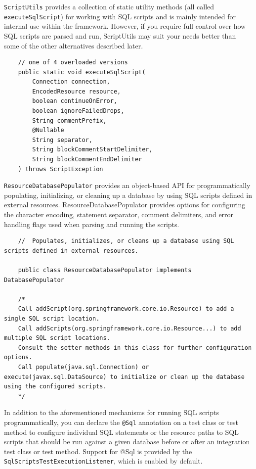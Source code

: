 \documentclass{scrartcl}
\begin{document}
\lstinline|ScriptUtils| provides a collection of static utility methods (all called \lstinline|executeSqlScript|) for working with SQL scripts and is mainly intended for internal use within the framework. However, if you require full control over how SQL scripts are parsed and run, ScriptUtils may suit your needs better than some of the other alternatives described later.

\begin{lstlisting}
    // one of 4 overloaded versions
    public static void executeSqlScript(
        Connection connection,
        EncodedResource resource,
        boolean continueOnError,
        boolean ignoreFailedDrops,
        String commentPrefix,
        @Nullable
        String separator,
        String blockCommentStartDelimiter,
        String blockCommentEndDelimiter
    ) throws ScriptException
\end{lstlisting}

\lstinline|ResourceDatabasePopulator| provides an object-based API for programmatically populating, initializing, or cleaning up a database by using SQL scripts defined in external resources. ResourceDatabasePopulator provides options for configuring the character encoding, statement separator, comment delimiters, and error handling flags used when parsing and running the scripts.

\begin{lstlisting}
    //  Populates, initializes, or cleans up a database using SQL scripts defined in external resources.

    public class ResourceDatabasePopulator implements DatabasePopulator

    /*
    Call addScript(org.springframework.core.io.Resource) to add a single SQL script location.
    Call addScripts(org.springframework.core.io.Resource...) to add multiple SQL script locations.
    Consult the setter methods in this class for further configuration options.
    Call populate(java.sql.Connection) or execute(javax.sql.DataSource) to initialize or clean up the database using the configured scripts.
    */

\end{lstlisting}

In addition to the aforementioned mechanisms for running SQL scripts programmatically, you can declare the \lstinline|@Sql| annotation on a test class or test method to configure individual SQL statements or the resource paths to SQL scripts that should be run against a given database before or after an integration test class or test method. Support for @Sql is provided by the \lstinline|SqlScriptsTestExecutionListener|, which is enabled by default.
\end{document}
